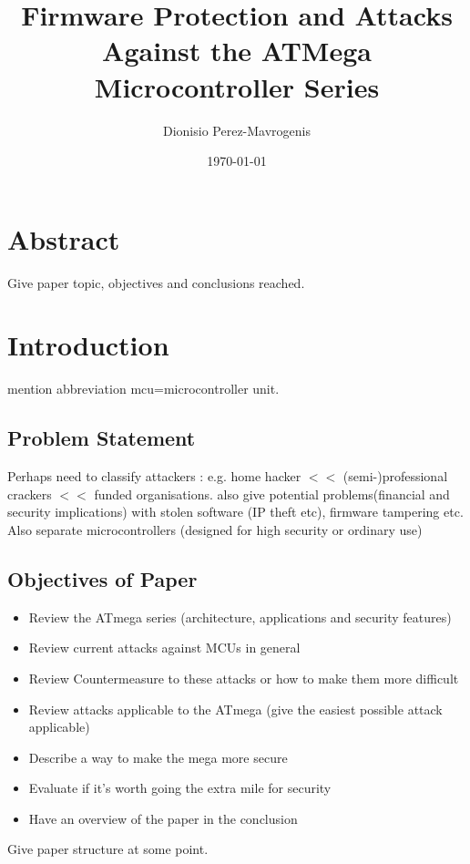 \documentclass[12pt,a4paper,twocolumn]{article}
\author{Dionisio Perez-Mavrogenis}
\title{Firmware Protection and Attacks Against the ATMega Microcontroller Series}
\date{\today}
\begin{document}
	\maketitle
	
\section*{Abstract}
	Give paper topic, objectives and conclusions reached.
	

\section{Introduction}
	mention abbreviation mcu=microcontroller unit. 
	\subsection{Problem Statement}
	Perhaps need to classify attackers : e.g. home hacker $<<$ (semi-)professional crackers $<<$ funded organisations. also give potential problems(financial and security implications) with stolen software (IP theft etc), firmware tampering etc. Also separate microcontrollers (designed for high security or ordinary use)

	\subsection{Objectives of Paper}
	\begin{itemize}
	\item Review the ATmega series (architecture, applications and security features)\\
	\item Review current attacks against MCUs in general \\
	\item Review Countermeasure to these attacks or how to make them more difficult
	\item Review attacks applicable to the ATmega (give the easiest possible attack applicable)
	\item Describe a way to make the mega more secure
	\item Evaluate if it's worth going the extra mile for security
	\item Have an overview of the paper in the conclusion
	\end{itemize}
	
	Give paper structure at some point.
	
\end{document}
